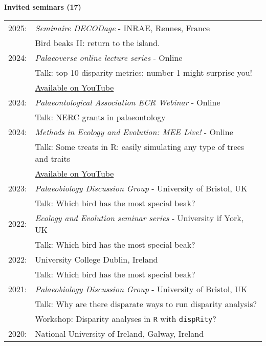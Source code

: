 \documentclass[10pt,a4paper]{article}
\begin{document}
{\raggedright\textbf{Invited seminars (17)}\\[1.5ex]
\begin{tabular}{ll}
2025: & \textit{Seminaire DECODage} - INRAE, Rennes, France \\
      & Bird beaks II: return to the island.\\
2024: & \textit{Palaeoverse online lecture series} - Online \\
      & Talk: top 10 disparity metrics; number 1 might surprise you!\\
      & \href{https://www.youtube.com/watch?v=JKpUQbxID9A}{Available on YouTube}\\
2024: & \textit{Palaeontological Association ECR Webinar} - Online \\
      & Talk: NERC grants in palaeontology\\
2024: & \textit{Methods in Ecology and Evolution: MEE Live!} - Online \\
      & Talk: Some treats in R: easily simulating any type of trees and traits\\
      & \href{https://www.youtube.com/watch?v=QUhaFZxER2I}{Available on YouTube}\\
2023: & \textit{Palaeobiology Discussion Group} - University of Bristol, UK\\
      & Talk: Which bird has the most special beak?\\
2022: & \textit{Ecology and Evolution seminar series} - University if York, UK\\
      & Talk: Which bird has the most special beak?\\
2022: & University College Dublin, Ireland\\
      & Talk: Which bird has the most special beak?\\
2021: & \textit{Palaeobiology Discussion Group} - University of Bristol, UK\\
      & Talk: Why are there disparate ways to run disparity analysis?\\
      & Workshop: Disparity analyses in \texttt{R} with \texttt{dispRity}?\\ 
2020: & National University of Ireland, Galway, Ireland\\

\end{tabular}}
\end{document}
